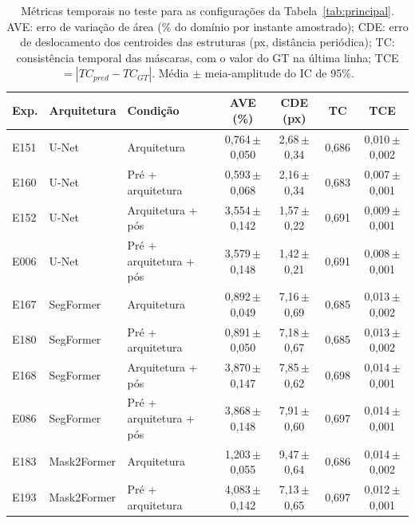 \begin{table}[htbp]
\centering
\caption{Métricas temporais no teste para as configurações da Tabela~\ref{tab:principal}. AVE: erro de variação de área (\% do domínio por instante amostrado); CDE: erro de deslocamento dos centroides das estruturas (px, distância periódica); TC: consistência temporal das máscaras, com o valor do GT na última linha; TCE $=|TC_{pred}-TC_{GT}|$. Média $\pm$ meia-amplitude do IC de 95\%.}
\label{tab:temporal}
\footnotesize\setlength{\tabcolsep}{3pt}
\begin{sbcfitwidth}
\begin{tabular}{lllcccc}
\toprule
Exp. & Arquitetura & Condição & AVE (\%) & CDE (px) & TC & TCE \\
\midrule
E151 & U-Net & Arquitetura & 0{,}764\,{\scriptsize$\pm$0{,}050} & 2{,}68\,{\scriptsize$\pm$0{,}34} & 0{,}686 & 0{,}010\,{\scriptsize$\pm$0{,}002} \\
E160 & U-Net & Pré + arquitetura & 0{,}593\,{\scriptsize$\pm$0{,}068} & 2{,}16\,{\scriptsize$\pm$0{,}34} & 0{,}683 & 0{,}007\,{\scriptsize$\pm$0{,}001} \\
E152 & U-Net & Arquitetura + pós & 3{,}554\,{\scriptsize$\pm$0{,}142} & 1{,}57\,{\scriptsize$\pm$0{,}22} & 0{,}691 & 0{,}009\,{\scriptsize$\pm$0{,}001} \\
E006 & U-Net & Pré + arquitetura + pós & 3{,}579\,{\scriptsize$\pm$0{,}148} & 1{,}42\,{\scriptsize$\pm$0{,}21} & 0{,}691 & 0{,}008\,{\scriptsize$\pm$0{,}001} \\
\midrule
E167 & SegFormer & Arquitetura & 0{,}892\,{\scriptsize$\pm$0{,}049} & 7{,}16\,{\scriptsize$\pm$0{,}69} & 0{,}685 & 0{,}013\,{\scriptsize$\pm$0{,}002} \\
E180 & SegFormer & Pré + arquitetura & 0{,}891\,{\scriptsize$\pm$0{,}050} & 7{,}18\,{\scriptsize$\pm$0{,}67} & 0{,}685 & 0{,}013\,{\scriptsize$\pm$0{,}002} \\
E168 & SegFormer & Arquitetura + pós & 3{,}870\,{\scriptsize$\pm$0{,}147} & 7{,}85\,{\scriptsize$\pm$0{,}62} & 0{,}698 & 0{,}014\,{\scriptsize$\pm$0{,}001} \\
E086 & SegFormer & Pré + arquitetura + pós & 3{,}868\,{\scriptsize$\pm$0{,}148} & 7{,}91\,{\scriptsize$\pm$0{,}60} & 0{,}697 & 0{,}014\,{\scriptsize$\pm$0{,}001} \\
\midrule
E183 & Mask2Former & Arquitetura & 1{,}203\,{\scriptsize$\pm$0{,}055} & 9{,}47\,{\scriptsize$\pm$0{,}64} & 0{,}686 & 0{,}014\,{\scriptsize$\pm$0{,}002} \\
E193 & Mask2Former & Pré + arquitetura & 4{,}083\,{\scriptsize$\pm$0{,}142} & 7{,}13\,{\scriptsize$\pm$0{,}65} & 0{,}697 & 0{,}012\,{\scriptsize$\pm$0{,}001} \\

\end{tabular}
\end{sbcfitwidth}
\end{table}
